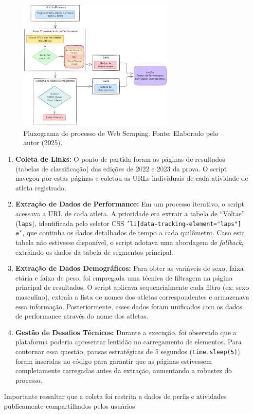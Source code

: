 \begin{figure}[h!]
    \centering
    \includegraphics[width=0.7\textwidth]{Imagens/fluxo_webscraping.png}
    \caption{Fluxograma do processo de Web Scraping. Fonte: Elaborado pelo autor (2025).}
    \label{fig:fluxograma}
\end{figure}

\begin{enumerate}
    \item \textbf{Coleta de Links:} O ponto de partida foram as páginas de resultados (tabelas de classificação) das edições de 2022 e 2023 da prova. O script navegou por estas páginas e coletou as URLs individuais de cada atividade de atleta registrada.
    
    \item \textbf{Extração de Dados de Performance:} Em um processo iterativo, o script acessava a URL de cada atleta. A prioridade era extrair a tabela de ``Voltas'' (\texttt{laps}), identificada pelo seletor CSS \texttt{'li[data-tracking-element="laps"] a'}, que continha os dados detalhados de tempo a cada quilômetro. Caso esta tabela não estivesse disponível, o script adotava uma abordagem de \emph{fallback}, extraindo os dados da tabela de segmentos principal.
    
    \item \textbf{Extração de Dados Demográficos:} Para obter as variáveis de sexo, faixa etária e faixa de peso, foi empregada uma técnica de filtragem na página principal de resultados. O script aplicava sequencialmente cada filtro (ex: sexo masculino), extraía a lista de nomes dos atletas correspondentes e armazenava essa informação. Posteriormente, esses dados foram unificados com os dados de performance através do nome dos atletas.
    
    \item \textbf{Gestão de Desafios Técnicos:} Durante a execução, foi observado que a plataforma poderia apresentar lentidão no carregamento de elementos. Para contornar essa questão, pausas estratégicas de 5 segundos (\texttt{time.sleep(5)}) foram inseridas no código para garantir que as páginas estivessem completamente carregadas antes da extração, aumentando a robustez do processo.
\end{enumerate}
Importante ressaltar que a coleta foi restrita a dados de perfis e atividades publicamente compartilhados pelos usuários.

